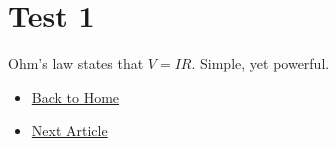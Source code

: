 \documentclass{article}
\begin{document}
\section*{Test 1}

Ohm's law states that \( V = IR \). Simple, yet powerful.

\begin{itemize}
  \item \href{../index.html}{Back to Home}
  \item \href{test2.html}{Next Article}
\end{itemize}
\end{document}
